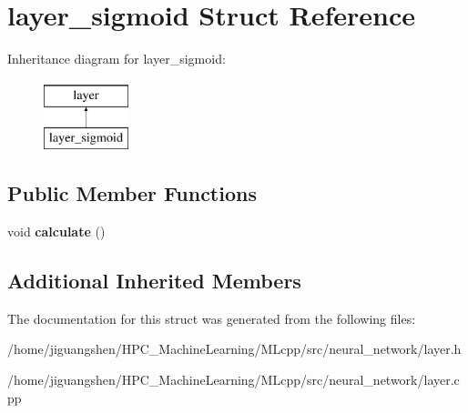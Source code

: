 \hypertarget{structlayer__sigmoid}{\section{layer\-\_\-sigmoid Struct Reference}
\label{structlayer__sigmoid}
}
Inheritance diagram for layer\-\_\-sigmoid\-:\begin{figure}[H]
\begin{center}
\leavevmode
\includegraphics[height=2.000000cm]{structlayer__sigmoid}
\end{center}
\end{figure}
\subsection*{Public Member Functions}
\begin{DoxyCompactItemize}
\item 
\hypertarget{structlayer__sigmoid_a04a54d415eb5412fcd78478b3e113f3f}{void {\bfseries calculate} ()}\label{structlayer__sigmoid_a04a54d415eb5412fcd78478b3e113f3f}

\end{DoxyCompactItemize}
\subsection*{Additional Inherited Members}


The documentation for this struct was generated from the following files\-:\begin{DoxyCompactItemize}
\item 
/home/jiguangshen/\-H\-P\-C\-\_\-\-Machine\-Learning/\-M\-Lcpp/src/neural\-\_\-network/layer.\-h\item 
/home/jiguangshen/\-H\-P\-C\-\_\-\-Machine\-Learning/\-M\-Lcpp/src/neural\-\_\-network/layer.\-cpp\end{DoxyCompactItemize}
